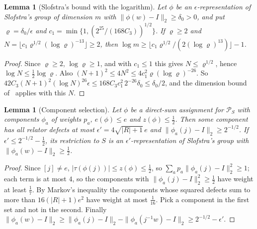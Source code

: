 \documentclass[11pt,a4paper]{article}
\theoremstyle{plain}
\newtheorem{lemma}[theorem]{Lemma}
\theoremstyle{definition}
\theoremstyle{remark}
\begin{document}
\begin{lemma}[Slofstra's bound with the logarithm]\label{lem:slofstra-log}
Let $\phi$ be an $\epsilon$-representation of Slofstra's group of dimension $m$ with $\|\phi(w)-I\|_2\ge\delta_0>0$, and put $\varrho=\delta_0/\epsilon$ and
$c_1=\min\{1,(2^{25}/(168C_3))^{1/2}\}$. If $\varrho\ge2$ and $N=\lfloor c_1\varrho^{1/2}(\log\varrho)^{-13}\rfloor\ge2$, then
$\log m\ge\lfloor c_1\varrho^{1/2}/(2(\log\varrho)^{13})\rfloor-1$.
\end{lemma}

\begin{proof}
Since $\varrho\ge2$, $\log\varrho\ge1$, and with $c_1\le1$ this gives $N\le\varrho^{1/2}$, hence $\log N\le\frac12\log\varrho$. Also $(N+1)^2\le4N^2\le4c_1^2\varrho(\log\varrho)^{-26}$. So
$42C_3(N+1)^2(\log N)^{26}\epsilon\le168C_3c_1^2\,2^{-26}\delta_0\le\delta_0/2$, and the dimension bound of~\cite{Slofstra2018} applies with this $N$.
\end{proof}

\begin{lemma}[Component selection]\label{lem:component}
Let $\phi$ be a direct-sum assignment for $\mathcal P_S$ with components $\phi_a$ of weights $p_a$, $e(\phi)\le e$ and $z(\phi)\le\frac12$. Then some component has all
relator defects at most $\epsilon'=4\sqrt{|R|+1}\,e$ and $\|\phi_a(j)-I\|_2\ge2^{-1/2}$. If $\epsilon'\le2^{-1/2}-\frac12$, its restriction to $S$ is an
$\epsilon'$-representation of Slofstra's group with $\|\phi_a(w)-I\|_2\ge\frac12$.
\end{lemma}

\begin{proof}
Since $[j]\ne e$, $|\tau(\phi(j))|\le z(\phi)\le\frac12$, so $\sum_ap_a\|\phi_a(j)-I\|_2^2\ge1$; each term is at most $4$, so the components with
$\|\phi_a(j)-I\|_2^2\ge\frac12$ have weight at least $\frac17$. By Markov's inequality the components whose squared defects sum to more than $16(|R|+1)e^2$
have weight at most $\frac1{16}$. Pick a component in the first set and not in the second. Finally
$\|\phi_a(w)-I\|_2\ge\|\phi_a(j)-I\|_2-\|\phi_a(j^{-1}w)-I\|_2\ge2^{-1/2}-\epsilon'$.
\end{proof}
\end{document}
